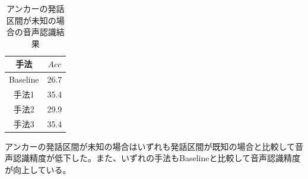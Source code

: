 \begin{table}[H]
  \begin{center}
    \caption{アンカーの発話区間が未知の場合の音声認識結果 \label{table:result_sprecog2}}
    \begin{tabular}{|c||c|} \hline
     手法  & $Acc$  \\ \hline
     Baseline & 26.7 \\ \hline
     手法1  & 35.4  \\ \hline
     手法2  & 29.9  \\ \hline  
     手法3  & 35.4  \\ \hline
    \end{tabular}
  \end{center}
\end{table}
アンカーの発話区間が未知の場合はいずれも発話区間が既知の場合と比較して音声認識精度が低下した。また、いずれの手法もBaselineと比較して音声認識精度が向上している。

